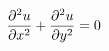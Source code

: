 \documentclass[preview]{standalone}
\begin{document}
\begin{align*}
\special{dvisvgm:raw <g id='unique000'>}\dfrac{\partial^2 u}{\partial x^2} + \dfrac{\partial^2 u}{\partial y^2} = 0\special{dvisvgm:raw </g>}
\end{align*}
\end{document}
